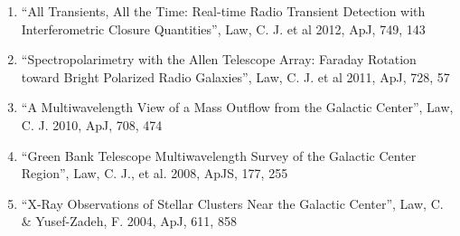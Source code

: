 \documentclass[11pt]{article}
\begin{document}
\begin{enumerate}

    \item ``All Transients, All the Time: Real-time Radio Transient Detection with Interferometric Closure Quantities'',  Law, C. J. et al 2012, ApJ, 749, 143


    \item ``Spectropolarimetry with the Allen Telescope Array:  Faraday Rotation toward Bright Polarized Radio Galaxies'',  Law, C. J. et al 2011, ApJ, 728, 57






    \item ``A Multiwavelength View of a Mass Outflow from the Galactic Center'',  Law, C. J. 2010, ApJ, 708, 474

    \item ``Green Bank Telescope Multiwavelength Survey of the Galactic Center Region'',  Law, C. J., et al. 2008, ApJS, 177, 255

    \item ``X-Ray Observations of Stellar Clusters Near the Galactic Center'',  Law, C. \& Yusef-Zadeh, F. 2004, ApJ, 611, 858

\end{enumerate}
\end{document}
